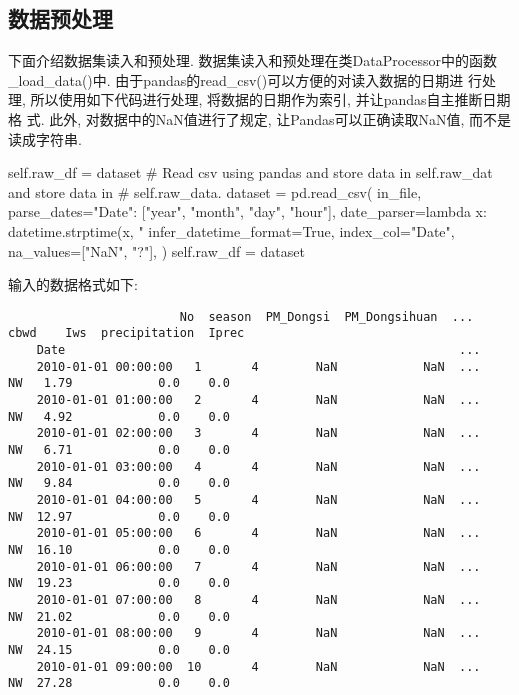 \subsection{数据预处理}
下面介绍数据集读入和预处理. 数据集读入和预处理在类DataProcessor中的函数
\_load\_data()中. 由于pandas的read\_csv()可以方便的对读入数据的日期进
行处理, 所以使用如下代码进行处理, 将数据的日期作为索引, 并让pandas自主推断日期格
式. 此外, 对数据中的NaN值进行了规定, 让Pandas可以正确读取NaN值, 而不是读成字符串.
\begin{python}
    self.raw_df = dataset
    # Read csv using pandas and store data in self.raw_dat and store data in
    # self.raw_data.
    dataset = pd.read_csv(
        in_file,
        parse_dates={"Date": ["year", "month", "day", "hour"]},
        date_parser=lambda x: datetime.strptime(x, "%
        infer_datetime_format=True,
        index_col="Date",
        na_values=["NaN", "?"],
    )
    self.raw_df = dataset
\end{python}

输入的数据格式如下:
\begin{lstlisting}
                        No  season  PM_Dongsi  PM_Dongsihuan  ...  cbwd    Iws  precipitation  Iprec
    Date                                                       ...                               
    2010-01-01 00:00:00   1       4        NaN            NaN  ...    NW   1.79            0.0    0.0
    2010-01-01 01:00:00   2       4        NaN            NaN  ...    NW   4.92            0.0    0.0
    2010-01-01 02:00:00   3       4        NaN            NaN  ...    NW   6.71            0.0    0.0
    2010-01-01 03:00:00   4       4        NaN            NaN  ...    NW   9.84            0.0    0.0
    2010-01-01 04:00:00   5       4        NaN            NaN  ...    NW  12.97            0.0    0.0
    2010-01-01 05:00:00   6       4        NaN            NaN  ...    NW  16.10            0.0    0.0
    2010-01-01 06:00:00   7       4        NaN            NaN  ...    NW  19.23            0.0    0.0
    2010-01-01 07:00:00   8       4        NaN            NaN  ...    NW  21.02            0.0    0.0
    2010-01-01 08:00:00   9       4        NaN            NaN  ...    NW  24.15            0.0    0.0
    2010-01-01 09:00:00  10       4        NaN            NaN  ...    NW  27.28            0.0    0.0
\end{lstlisting}

